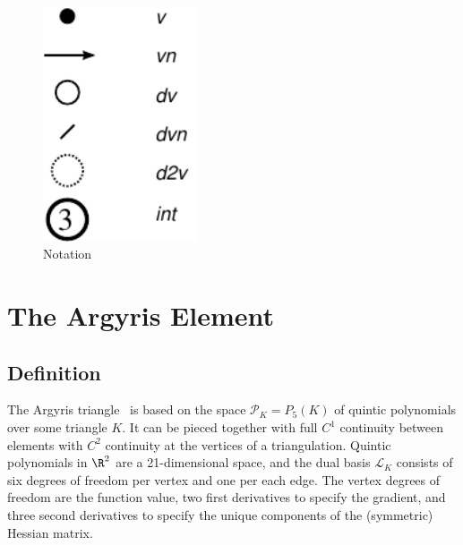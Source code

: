 \begin{figure}[h]
  \hspace{2cm}
  \includegraphics[width=4.5cm]{chapters/kirby-6/pdf/notation.pdf}
  \caption{Notation}
  \label{fig:notation}
\end{figure}

\newpage

\section{The Argyris Element}

\subsection{Definition}

The Argyris triangle~\cite{ArgyrisFriedScharpf1968,Ciarlet2002} is based
on the space \(
\mathcal{P}_K = P_5(K) \) of quintic
polynomials over some triangle \( K \).  It can be pieced together
with full \( C^1 \) continuity between elements with \( C^2 \)
continuity at the vertices of a triangulation. Quintic polynomials in
$\R^2$ are a 21-dimensional space, and the dual basis \( \mathcal{L}_K
\) consists of six degrees of freedom per vertex and one per each edge. The vertex
degrees of freedom are the function value, two first derivatives to specify the
gradient, and three second derivatives to specify the unique
components of the (symmetric) Hessian matrix.

